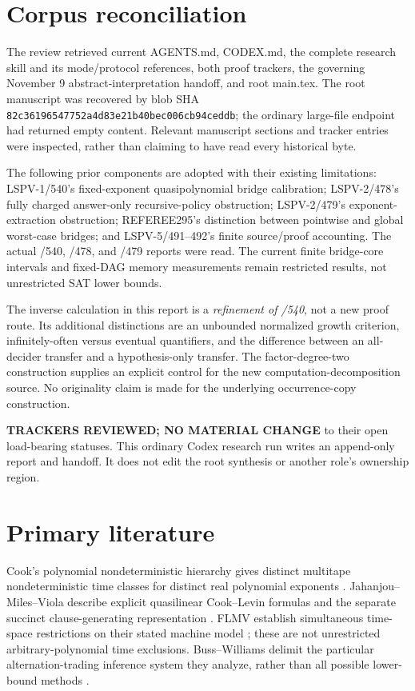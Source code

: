 \documentclass[11pt]{article}
\begin{document}
\section*{Corpus reconciliation}
The review retrieved current AGENTS.md, CODEX.md, the complete research skill
and its mode/protocol references, both proof trackers, the governing November
9 abstract-interpretation handoff, and root main.tex. The root manuscript was
recovered by blob SHA
\texttt{82c36196547752a4d83e21b40bec006cb94ceddb}; the ordinary large-file endpoint
had returned empty content. Relevant manuscript sections and tracker entries
were inspected, rather than claiming to have read every historical byte.

The following prior components are adopted with their existing limitations:
LSPV-1/540's fixed-exponent quasipolynomial bridge calibration;
LSPV-2/478's fully charged answer-only recursive-policy obstruction;
LSPV-2/479's exponent-extraction obstruction;
REFEREE295's distinction between pointwise and global worst-case bridges;
and LSPV-5/491--492's finite source/proof accounting.
The actual /540, /478, and /479 reports were read.
The current finite bridge-core intervals and fixed-DAG memory measurements
remain restricted results, not unrestricted SAT lower bounds.

The inverse calculation in this report is a \emph{refinement of /540},
not a new proof route. Its additional distinctions are an unbounded normalized
growth criterion, infinitely-often versus eventual quantifiers, and the
difference between an all-decider transfer and a hypothesis-only transfer.
The factor-degree-two construction supplies an explicit control for the new
computation-decomposition source. No originality claim is made for the
underlying occurrence-copy construction.

\textbf{TRACKERS REVIEWED; NO MATERIAL CHANGE} to their open load-bearing
statuses. This ordinary Codex research run writes an append-only report and
handoff. It does not edit the root synthesis or another role's ownership region.

\section*{Primary literature}
Cook's polynomial nondeterministic hierarchy gives distinct multitape
nondeterministic time classes for distinct real polynomial exponents
\cite{cook1973}. Jahanjou--Miles--Viola describe explicit quasilinear
Cook--Levin formulas and the separate succinct clause-generating
representation \cite{jmv2013}. FLMV establish simultaneous time-space
restrictions on their stated machine model \cite{flmv2005}; these are not
unrestricted arbitrary-polynomial time exclusions. Buss--Williams delimit
the particular alternation-trading inference system they analyze, rather
than all possible lower-bound methods \cite{busswilliams2011}.
\end{document}

